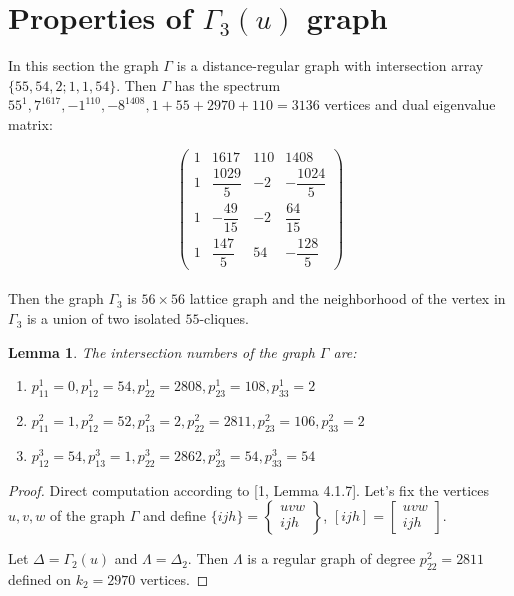 \documentclass{article}
\newtheorem{lemma}{Lemma}
\theoremstyle{definition}
\theoremstyle{definition}
\theoremstyle{remark}
\begin{document}
\section{Properties of $\Gamma_3(u)$ graph}

In this section the graph $\Gamma$ is a distance-regular graph with intersection array $\{55, 54, 2; 1, 1, 54\}$. Then $\Gamma$ has the spectrum $55^1, 7^{1617}, -1^{110}, -8^{1408}, 1 + 55 + 2970 + 110 = 3136$ vertices and dual eigenvalue matrix:

\renewcommand{\arraystretch}{2.2}
\[
\begin{pmatrix}
    1 & 1617 & 110 & 1408 \\
    1 & \dfrac{1029}{5} & -2 & -\dfrac{1024}{5} \\
    1 & -\dfrac{49}{15} & -2 & \dfrac{64}{15} \\
    1 & \dfrac{147}{5} & 54 & -\dfrac{128}{5}
\end{pmatrix}
\]
\renewcommand{\arraystretch}{1.0}
\\

Then the graph $\Gamma_3$ is $56 \times 56$ lattice graph and the neighborhood of the vertex in $\Gamma_3$ is a union of two isolated $55$-cliques.

\begin{lemma}The intersection numbers of the graph $\Gamma$ are:
    \begin{enumerate}
	\item $p_{11}^1 = 0, p_{12}^1 = 54, p_{22}^1 = 2808, p_{23}^1 = 108, p_{33}^1 = 2$
	\item $p_{11}^2 = 1, p_{12}^2 = 52, p_{13}^2 = 2, p_{22}^2 = 2811, p_{23}^2 = 106, p_{33}^2 = 2$
	\item $p_{12}^3 = 54, p_{13}^3 = 1, p_{22}^3 = 2862, p_{23}^3 = 54, p_{33}^3 = 54$
    \end{enumerate}
\end{lemma}

\begin{proof} Direct computation according to [1, Lemma 4.1.7].
    Let's fix the vertices $u,v,w$ of the graph $\Gamma$ and define
$ \{ijh\} = \begin{Bmatrix} uvw \\ ijh \end{Bmatrix}$,
$ [ijh] = \begin{bmatrix} uvw \\ ijh \end{bmatrix}$.

Let $\Delta = \Gamma_2(u)$ and $\Lambda = \Delta_2$. Then $\Lambda$ is a regular graph of degree $p^2_{22} = 2811$ defined on $k_2 = 2970$ vertices.
\end{proof}
\end{document}

